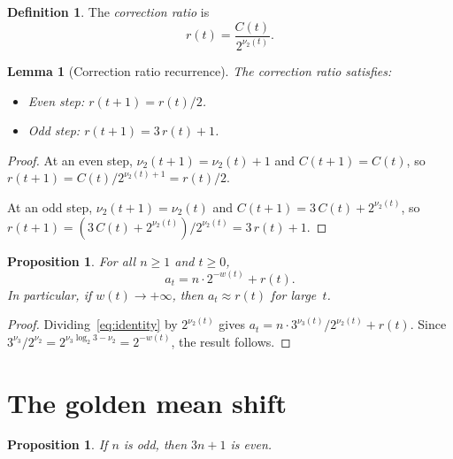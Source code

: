 \documentclass[manuscript]{aomart}
\theoremstyle{plain}
\newtheorem{proposition}[theorem]{Proposition}
\newtheorem{lemma}[theorem]{Lemma}
\theoremstyle{definition}
\newtheorem{definition}[theorem]{Definition}
\theoremstyle{remark}
\numberwithin{equation}{section}
\begin{document}
\begin{definition}\label{def:correction-ratio}
The \emph{correction ratio} is
\[
  r(t) = \frac{C(t)}{2^{\nu_2(t)}}.
\]
\end{definition}

\begin{lemma}[Correction ratio recurrence]\label{lem:r-recurrence}
The correction ratio satisfies:
\begin{itemize}
  \item Even step: $r(t{+}1) = r(t)/2$.
  \item Odd step: $r(t{+}1) = 3\,r(t) + 1$.
\end{itemize}
\end{lemma}

\begin{proof}
At an even step, $\nu_2(t{+}1) = \nu_2(t) + 1$ and
$C(t{+}1) = C(t)$, so
$r(t{+}1) = C(t)/2^{\nu_2(t)+1} = r(t)/2$.

At an odd step, $\nu_2(t{+}1) = \nu_2(t)$ and
$C(t{+}1) = 3\,C(t) + 2^{\nu_2(t)}$, so
$r(t{+}1) = (3\,C(t) + 2^{\nu_2(t)})/2^{\nu_2(t)} = 3\,r(t) + 1$.
\end{proof}

\begin{proposition}\label{prop:a-decomposition}
For all $n \ge 1$ and $t \ge 0$,
\begin{equation}\label{eq:a-decomposition}
  a_t = n \cdot 2^{-w(t)} + r(t).
\end{equation}
In particular, if $w(t) \to +\infty$, then $a_t \approx r(t)$ for
large~$t$.
\end{proposition}

\begin{proof}
Dividing~\eqref{eq:identity} by $2^{\nu_2(t)}$ gives
$a_t = n \cdot 3^{\nu_3(t)} / 2^{\nu_2(t)} + r(t)$.  Since
$3^{\nu_3} / 2^{\nu_2} = 2^{\nu_3 \log_2 3 - \nu_2} = 2^{-w(t)}$,
the result follows.
\end{proof}

\section{The golden mean shift}\label{sec:golden}

\begin{proposition}\label{prop:odd-gives-even}
If $n$ is odd, then $3n + 1$ is even.
\end{proposition}
\end{document}
